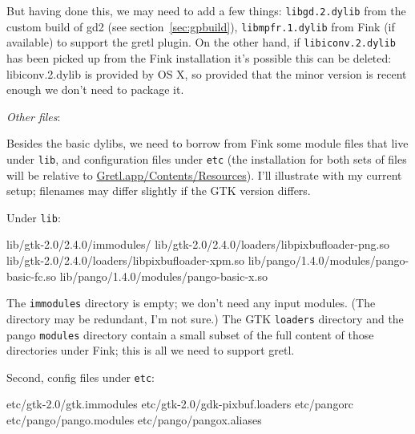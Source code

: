 \documentclass{article}
\begin{document}

But having done this, we may need to add a few things:
\texttt{libgd.2.dylib} from the custom build of gd2 (see
section~\ref{sec:gpbuild}), \texttt{libmpfr.1.dylib} from Fink (if
available) to support the gretl plugin.  On the other hand, if
\texttt{libiconv.2.dylib} has been picked up from the Fink
installation it's possible this can be deleted: libiconv.2.dylib is
provided by OS X, so provided that the minor version is recent enough
we don't need to package it.

\textit{Other files}: 

Besides the basic dylibs, we need to borrow from Fink some module
files that live under \texttt{lib}, and configuration files under
\texttt{etc} (the installation for both sets of files will be relative
to \url{Gretl.app/Contents/Resources}).  I'll illustrate with my
current setup; filenames may differ slightly if the GTK version
differs.

Under \texttt{lib}:

\begin{code}
lib/gtk-2.0/2.4.0/immodules/
lib/gtk-2.0/2.4.0/loaders/libpixbufloader-png.so
lib/gtk-2.0/2.4.0/loaders/libpixbufloader-xpm.so
lib/pango/1.4.0/modules/pango-basic-fc.so  
lib/pango/1.4.0/modules/pango-basic-x.so
\end{code}

The \texttt{immodules} directory is empty; we don't need any input
modules.  (The directory may be redundant, I'm not sure.)  The GTK
\texttt{loaders} directory and the pango \texttt{modules} directory
contain a small subset of the full content of those directories under
Fink; this is all we need to support gretl. 

Second, config files under \texttt{etc}:

\begin{code}
etc/gtk-2.0/gtk.immodules
etc/gtk-2.0/gdk-pixbuf.loaders
etc/pangorc
etc/pango/pango.modules
etc/pango/pangox.aliases
\end{code}
\end{document}
